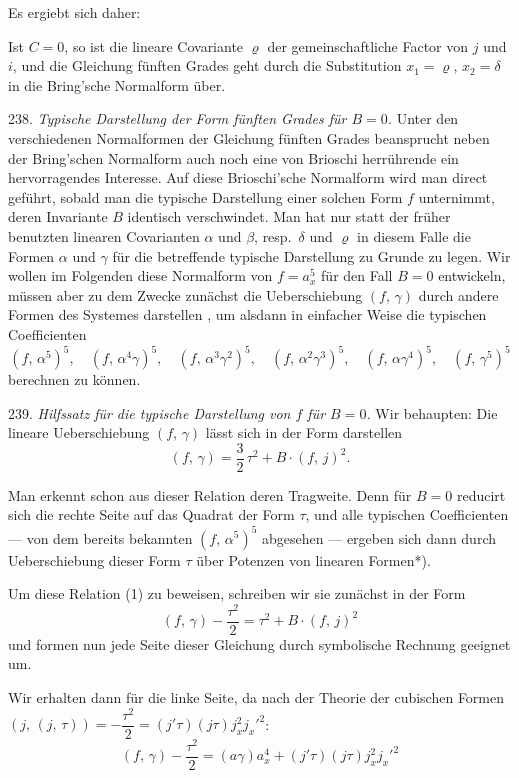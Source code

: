 \documentclass[11pt]{article}
\providecommand{\weberpage}[1]{}
\providecommand{\weq}[2]{\begin{equation}\tag{#1}#2\end{equation}}
\begin{document}
Es ergiebt sich daher:

\glqq Ist $C=0$, so ist die lineare Covariante $\varrho$ der gemeinschaftliche
 Factor von $j$ und $i$, und die Gleichung f\"unften Grades
geht durch die Substitution $x_1=\varrho$, $x_2=\delta$ in die Bring'sche
Normalform \"uber.\grqq{}


\weberpage{263}
238. \textit{Typische Darstellung der Form f\"unften Grades f\"ur $B=0$.}
Unter den verschiedenen Normalformen der Gleichung f\"unften Grades
beansprucht neben der Bring'schen Normalform auch noch eine
von Brioschi herr\"uhrende ein hervorragendes Interesse. Auf diese
Brioschi'sche Normalform wird man direct gef\"uhrt, sobald man die
typische Darstellung einer solchen Form $f$ unternimmt, deren Invariante
$B$ identisch verschwindet. Man hat nur statt der fr\"uher benutzten
linearen Covarianten $\alpha$ und $\beta$, resp.\ $\delta$ und $\varrho$ in diesem Falle die
Formen $\alpha$ und $\gamma$ f\"ur die betreffende typische Darstellung zu Grunde
zu legen. Wir wollen im Folgenden diese Normalform von $f=a_x^5$
f\"ur den Fall $B=0$ entwickeln, m\"ussen aber zu dem Zwecke zun\"achst
die Ueberschiebung $(f,\,\gamma)$ durch andere Formen des Systemes darstellen
, um alsdann in einfacher Weise die typischen Coefficienten
\[
(f,\,\alpha^5)^5,\quad (f,\,\alpha^4\gamma)^5,\quad (f,\,\alpha^3\gamma^2)^5,\quad (f,\,\alpha^2\gamma^3)^5,\quad (f,\,\alpha\gamma^4)^5,\quad (f,\,\gamma^5)^5
\]
berechnen zu k\"onnen.

239. \textit{Hilfssatz f\"ur die typische Darstellung von $f$ f\"ur $B=0$.} Wir
behaupten: Die lineare Ueberschiebung $(f,\,\gamma)$ l\"asst sich in der Form
darstellen
\weq{1}{(f,\,\gamma) = \frac{3}{2}\,\tau^2 + B\cdot(f,\,j)^2.}

Man erkennt schon aus dieser Relation deren Tragweite. Denn
f\"ur $B=0$ reducirt sich die rechte Seite auf das Quadrat der Form
$\tau$, und alle typischen Coefficienten --- von dem bereits bekannten
$(f,\,\alpha^5)^5$ abgesehen --- ergeben sich dann durch Ueberschiebung dieser
Form $\tau$ \"uber Potenzen von linearen Formen*).

Um diese Relation (1) zu beweisen, schreiben wir sie zun\"achst
in der Form
\[
(f,\,\gamma) - \frac{\tau^2}{2} = \tau^2 + B\cdot(f,\,j)^2
\]
und formen nun jede Seite dieser Gleichung durch symbolische Rechnung
geeignet um.

Wir erhalten dann f\"ur die linke Seite, da nach der Theorie der
cubischen Formen $(j,\,(j,\,\tau)) = -\dfrac{\tau^2}{2} = (j'\tau)(j\tau)j_x^2j_x'^2$:
\[
(f,\,\gamma) - \frac{\tau^2}{2} = (a\gamma)a_x^4 + (j'\tau)(j\tau)j_x^2j_x'^2
\]
\end{document}
